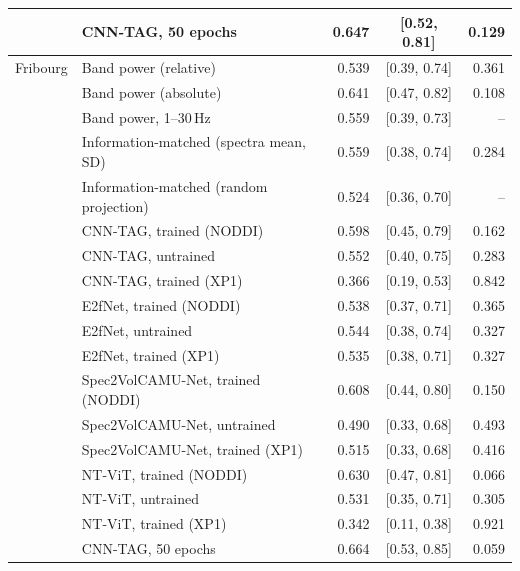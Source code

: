 \documentclass[10pt]{article}
\begin{document}
\begin{longtable}{l l r c r}
 & CNN-TAG, 50 epochs & 0.647 & [0.52, 0.81] & 0.129 \\
\midrule
Fribourg & Band power (relative) & 0.539 & [0.39, 0.74] & 0.361 \\
 & Band power (absolute) & 0.641 & [0.47, 0.82] & 0.108 \\
 & Band power, 1--30\,Hz & 0.559 & [0.39, 0.73] & -- \\
 & Information-matched (spectra mean, SD) & 0.559 & [0.38, 0.74] & 0.284 \\
 & Information-matched (random projection) & 0.524 & [0.36, 0.70] & -- \\
 & CNN-TAG, trained (NODDI) & 0.598 & [0.45, 0.79] & 0.162 \\
 & CNN-TAG, untrained & 0.552 & [0.40, 0.75] & 0.283 \\
 & CNN-TAG, trained (XP1) & 0.366 & [0.19, 0.53] & 0.842 \\
 & E2fNet, trained (NODDI) & 0.538 & [0.37, 0.71] & 0.365 \\
 & E2fNet, untrained & 0.544 & [0.38, 0.74] & 0.327 \\
 & E2fNet, trained (XP1) & 0.535 & [0.38, 0.71] & 0.327 \\
 & Spec2VolCAMU-Net, trained (NODDI) & 0.608 & [0.44, 0.80] & 0.150 \\
 & Spec2VolCAMU-Net, untrained & 0.490 & [0.33, 0.68] & 0.493 \\
 & Spec2VolCAMU-Net, trained (XP1) & 0.515 & [0.33, 0.68] & 0.416 \\
 & NT-ViT, trained (NODDI) & 0.630 & [0.47, 0.81] & 0.066 \\
 & NT-ViT, untrained & 0.531 & [0.35, 0.71] & 0.305 \\
 & NT-ViT, trained (XP1) & 0.342 & [0.11, 0.38] & 0.921 \\
 & CNN-TAG, 50 epochs & 0.664 & [0.53, 0.85] & 0.059 \\
\bottomrule
\end{longtable}
\end{document}
